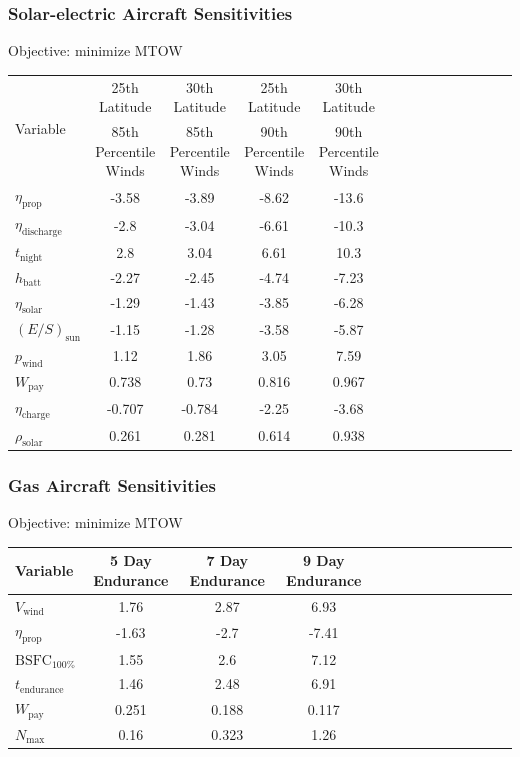 \documentclass{beamer}
\begin{document}
\begin{frame}
    \frametitle{Solar-electric Aircraft Sensitivities}

    Objective: minimize MTOW
    \tiny
    \begin{longtable}{lccccccccccccc}
        \toprule
        \toprule
        \multirow{2}{*}{Variable}& 25th Latitude & 30th Latitude & 25th Latitude & 30th Latitude \\
                                 & 85th Percentile Winds & 85th Percentile Winds & 90th Percentile Winds & 90th Percentile Winds \\
        \midrule
        $\eta_{\text{prop}}$ &-3.58 & -3.89 & -8.62 & -13.6\\
        $\eta_{\text{discharge}}$ &-2.8 & -3.04 & -6.61 & -10.3\\
        $t_{\text{night}}$ &2.8 & 3.04 & 6.61 & 10.3\\
        $h_{\text{batt}}$ &-2.27 & -2.45 & -4.74 & -7.23\\
        $\eta_{\text{solar}}$ &-1.29 & -1.43 & -3.85 & -6.28\\
        $(E/S)_{\text{sun}}$ &-1.15 & -1.28 & -3.58 & -5.87\\
        $p_{\text{wind}}$ &1.12 & 1.86 & 3.05 & 7.59\\
        $W_{\text{pay}}$ &0.738 & 0.73 & 0.816 & 0.967\\
        $\eta_{\text{charge}}$ &-0.707 & -0.784 & -2.25 & -3.68\\
        $\rho_{\text{solar}}$ &0.261 & 0.281 & 0.614 & 0.938\\
        \bottomrule
    \end{longtable}

\end{frame}

\begin{frame}
    \frametitle{Gas Aircraft Sensitivities}
    
    Objective: minimize MTOW

    \scriptsize
    \begin{longtable}{lccccccccccccc}
        \toprule
        \toprule
        Variable & 5 Day Endurance & 7 Day Endurance & 9 Day Endurance\\
        \midrule
        $V_{\text{wind}}$ &1.76 & 2.87 & 6.93\\
        $\eta_{\text{prop}}$ &-1.63 & -2.7 & -7.41\\
        $\text{BSFC}_{100\%}$ &1.55 & 2.6 & 7.12\\
            $t_{\text{endurance}}$ &1.46 & 2.48 & 6.91\\
        $W_{\text{pay}}$ &0.251 & 0.188 & 0.117\\
        $N_{\text{max}}$ &0.16 & 0.323 & 1.26\\
        \bottomrule
        \end{longtable}
    
\end{frame}
\end{document}
